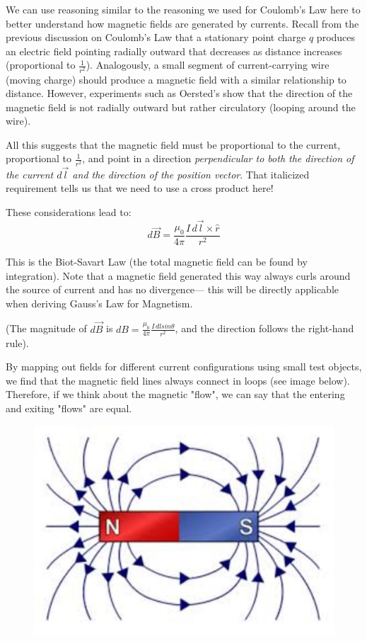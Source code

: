 \documentclass{article}
\begin{document}
\vspace{1em}


We can use reasoning similar to the reasoning we used for Coulomb's Law here to better understand how magnetic fields are generated by currents. Recall from the previous discussion on Coulomb's Law that a stationary point charge $q$ produces an electric field pointing radially outward that decreases as distance increases (proportional to $\frac{1}{r^2}$). Analogously, a small segment of current-carrying wire (moving charge) should produce a magnetic field with a similar relationship to distance. However, experiments such as Oersted's show that the direction of the magnetic field is not radially outward but rather circulatory (looping around the wire).

All this suggests that the magnetic field must be proportional to the current, proportional to $\frac{1}{r^2}$, and point in a direction \textit{perpendicular to both the direction of the current $d\vec l$ and the direction of the position vector}. That italicized requirement tells us that we need to use a cross product here! 

These considerations lead to:
\begin{equation}
d\vec B = \frac{\mu_0}{4\pi} \frac{I\, d\vec l \times \hat r}{r^2}
\end{equation}

This is the Biot-Savart Law (the total magnetic field can be found by integration). Note that a magnetic field generated this way always curls around the source of current and has no divergence— this will be directly applicable when deriving Gauss's Law for Magnetism.

(The magnitude of $d \vec B$ is $dB = \frac{\mu_0}{4\pi} \frac{I\, dl sin\theta}{r^2}$, and the direction follows the right-hand rule).

\vspace{1em}

By mapping out fields for different current configurations using small test objects, we find that the magnetic field lines always connect in loops (see image below). Therefore, if we think about the magnetic "flow", we can say that the entering and exiting "flows" are equal.

\vspace{3em}

\begin{figure}[H]
    \centering
    \includegraphics[width=0.5\linewidth]{barmagnet.png}
\end{figure}
\end{document}
